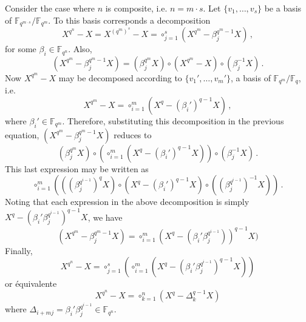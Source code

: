 \documentclass{sig-alternate}
\newcommand{\ff}[1]{\mathbb{F}_{#1}}
\newcommand{\qq}{q}
\newcommand{\nn}{n}
\newcommand{\qn}{{\qq^\nn}}
\newcommand{\basef}{\ff{\qq}}
\newcommand{\extf}{\ff{\qn}}
\begin{document}
 
 Consider the case where $\nn$ is composite, i.e. $n=m \cdot s$. Let $\{v_1,\ldots,v_{s}\}$ be a basis of $\mathbb{F}_{\qq^{m \cdot s}}/\mathbb{F}_{\qq^{m}}$. To this basis corresponds a decomposition
\begin{equation}
\label{decomp_n2}
X^{\qq^\nn}-X=X^{(\qq^{m})^{s}}-X=\circ_{j=1}^{s} (X^{\qq^{m}}-\beta_j^{\qq^{m}-1} X)\,,
\end{equation}
for some $\beta_i \in \extf$.
Also,  
\begin{equation}
\label{basic_decomp}
(X^{\qq^{m}}-\beta_j^{\qq^{m}-1} X)= (\beta_j^{\qq^{m}} X) \circ (X^{\qq^{m}}-X)\circ(\beta_j^{-1}X)\,.
\end{equation}
Now $X^{\qq^{m}}-X$ may be decomposed according to  $\{v_1',\ldots,v_{m}'\}$, a basis of $\mathbb{F}_{\qq^{m}}/\basef$, i.e.
\begin{equation}
\label{decomp_basef}
X^{\qq^{m}}-X=\circ_{i=1}^{m} (X^{\qq}-(\beta_i')^{\qq-1} X)\,,
\end{equation}
where $\beta_i' \in \mathbb{F}_{\qq^{m}}$. Therefore, substituting this decomposition in the previous equation, $(X^{\qq^{m}}-\beta_j^{\qq^{m}-1} X)$ reduces to 
$$(\beta_j^{\qq^{m}} X) \circ    \left(    \circ_{i=1}^{m} (X^{\qq}  -(\beta_i')^{\qq-1}    X)  \right) \circ(\beta_j^{-1}X)\,.$$
This last expression may be written as
$$\circ_{i=1}^{m} \left( ((\beta_j^{\qq^{i-1}})^\qq X) \circ  (X^{\qq}- (\beta_i')^{\qq-1}    X) \circ   ((\beta_j^{\qq^{i-1}})^{-1}X)  \right)\,.$$ 
Noting that each expression in the above decomposition is simply $X^\qq-(  \beta_i'  \beta_j^{\qq^{i-1}})^{q-1}  X$, we have
\begin{equation}
\label{decomp_partial}
(X^{\qq^{m}}- \beta_j^{\qq^{m}-1} X)=\circ_{i=1}^{m} (X^\qq-(\beta_i' \beta_j^{\qq^{i-1}}) )^{q-1} X)
\end{equation}
Finally,
\begin{equation}
\label{decomp_total}
X^{\qq^\nn}-X=\circ_{j=1}^{s} \left( \circ_{i=1}^{m} (X^\qq-(\beta_i'  \beta_j^{\qq^{i-1}})^{q-1}   X) \right)
\end{equation}
or équivalente
$$
X^{\qq^n}-X=\circ_{k=1}^{\nn} (X^q-\Delta_k^{q-1} X)
$$
where $\Delta_{i+m j}=\beta_i'  \beta_j^{\qq^{i-1}} \in \extf$.
\medskip
\end{document}
